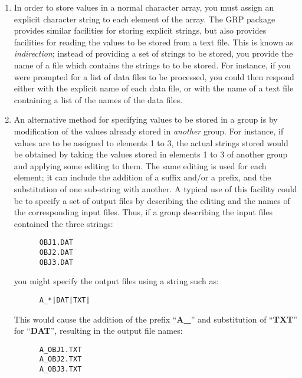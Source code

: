 \begin{enumerate}

\item In order to store values in a normal character array, you must assign an
explicit character string to each element of the array. The GRP package provides
similar facilities for storing explicit strings, but also provides facilities
for reading the values to be stored from a text file. This is known as {\em
indirection}; instead of providing a set of strings to be stored, you provide
the name of a file which contains the strings to to be stored. For instance, if
you were prompted for a list of data files to be processed, you could then
respond either with the explicit name of each data file, or with the name of a
text file containing a list of the names of the data files.

\item \label{ITEM:MOD} An alternative method for specifying values to be stored
in a group is by modification of the values already stored in {\em another}
group. For instance, if values are to be assigned to elements 1 to 3, the actual
strings stored would be obtained by taking the values stored in elements 1 to 3
of another group and applying some editing to them. The same editing is used for
each element; it can include the addition of a suffix and/or a prefix, and the
substitution of one sub-string with another. A typical use of this facility
could be to specify a set of output files by describing the editing and the names
of the corresponding input files. Thus, if a group describing the input files
contained the three strings:

\small
\begin{verbatim}
      OBJ1.DAT
      OBJ2.DAT
      OBJ3.DAT
\end{verbatim}
\normalsize

you might specify the output files using a string such as:

\small
\begin{verbatim}
      A_*|DAT|TXT|
\end{verbatim}
\normalsize

This would cause the addition of the
prefix ``{\bf A\_}'' and substitution of ``{\bf TXT}'' for ``{\bf DAT}'',
resulting in the output file names:

\small
\begin{verbatim}
      A_OBJ1.TXT
      A_OBJ2.TXT
      A_OBJ3.TXT
\end{verbatim}
\normalsize


\end{enumerate}
